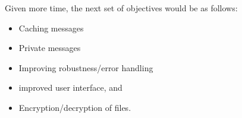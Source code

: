 \documentclass{article}
\begin{document}
Given more time, the next set of objectives would be as follows: 
\begin{itemize}
  \item Caching messages
  \item Private messages
  \item Improving robustness/error handling
  \item improved user interface, and
  \item Encryption/decryption of files. 
\end{itemize}









%
\end{document}
